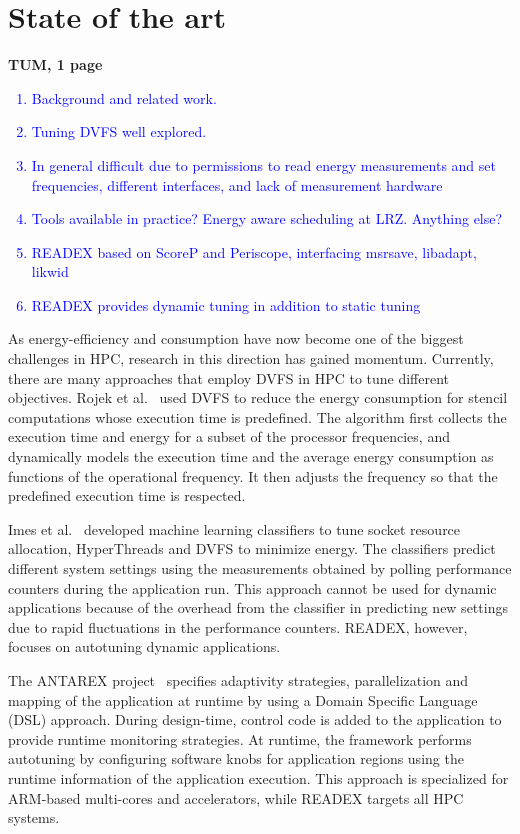 \section{State of the art} \label{sec:related-work}
\textbf{TUM, 1 page} 

\textcolor{blue}{
\begin{enumerate}
  \item Background and related work.
  \item Tuning DVFS well explored. 
  \item In general difficult due to permissions to read energy measurements and set frequencies, different interfaces, and lack of measurement hardware
  \item Tools available in practice? Energy aware scheduling at LRZ. Anything else?
  \item READEX based on ScoreP and Periscope, interfacing msrsave, libadapt, likwid
  \item READEX provides dynamic tuning in addition to static tuning
\end{enumerate}
}

As energy-efficiency and consumption have now become one of the biggest challenges in HPC, research in this direction has gained momentum. Currently, there are many approaches that employ DVFS in
HPC to tune different objectives. Rojek et al.~\cite{Rojek} used DVFS to reduce the energy consumption for stencil computations whose execution time is predefined. The algorithm first collects the execution time and energy for a subset of the processor frequencies, and dynamically models the execution time and the average energy consumption as functions of the operational frequency. It then adjusts the frequency so that the predefined execution time is respected.

Imes et al.~\cite{Imes} developed machine learning classifiers to tune socket resource allocation, HyperThreads and DVFS to minimize energy. The classifiers predict different system settings using the measurements obtained by polling performance counters during the application run. This approach cannot be used for dynamic applications because of the overhead from the classifier in predicting new settings due to rapid fluctuations in the performance counters. READEX, however, focuses on autotuning dynamic applications.
	
The ANTAREX project~\cite{silvano2016antarex} specifies adaptivity strategies, parallelization and mapping of the application at runtime by using a Domain Specific Language (DSL) approach. During design-time, control code is added to the application to provide runtime monitoring strategies. At runtime, the framework performs autotuning by configuring software knobs for application regions using the runtime information of the application execution. This approach is specialized for ARM-based multi-cores and accelerators, while READEX targets all HPC systems.

